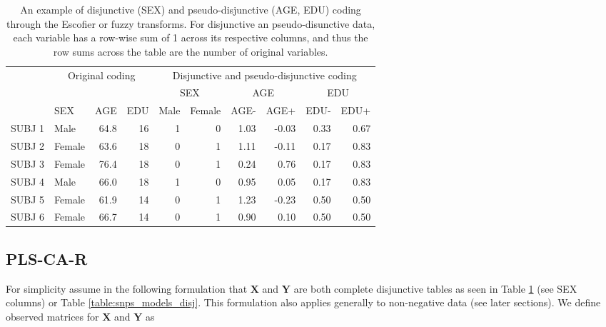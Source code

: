 \documentclass[12pt]{article}
\begin{document}
\begin{table}[!h]

\caption{\label{tab:unnamed-chunk-1}\label{table:disj} An example of disjunctive (SEX) and pseudo-disjunctive (AGE, EDU) coding through the Escofier or fuzzy transforms. For disjunctive an pseudo-disunctive data, each variable has a row-wise sum of 1 across its respective columns, and thus the row sums across the table are the number of original variables.}
\centering
\begin{tabular}[t]{llrrrrrrrr}
\toprule
\multicolumn{1}{c}{ } & \multicolumn{3}{c}{Original coding} & \multicolumn{6}{c}{Disjunctive and pseudo-disjunctive coding} \\
\cmidrule(l{2pt}r{2pt}){2-4} \cmidrule(l{2pt}r{2pt}){5-10}
\multicolumn{4}{c}{ } & \multicolumn{2}{c}{SEX} & \multicolumn{2}{c}{AGE} & \multicolumn{2}{c}{EDU} \\
\cmidrule(l{2pt}r{2pt}){5-6} \cmidrule(l{2pt}r{2pt}){7-8} \cmidrule(l{2pt}r{2pt}){9-10}
  & SEX & AGE & EDU & Male & Female & AGE- & AGE+ & EDU- & EDU+\\
\midrule
SUBJ 1 & Male & 64.8 & 16 & 1 & 0 & 1.03 & -0.03 & 0.33 & 0.67\\
SUBJ 2 & Female & 63.6 & 18 & 0 & 1 & 1.11 & -0.11 & 0.17 & 0.83\\
SUBJ 3 & Female & 76.4 & 18 & 0 & 1 & 0.24 & 0.76 & 0.17 & 0.83\\
SUBJ 4 & Male & 66.0 & 18 & 1 & 0 & 0.95 & 0.05 & 0.17 & 0.83\\
SUBJ 5 & Female & 61.9 & 14 & 0 & 1 & 1.23 & -0.23 & 0.50 & 0.50\\
\addlinespace
SUBJ 6 & Female & 66.7 & 14 & 0 & 1 & 0.90 & 0.10 & 0.50 & 0.50\\
\bottomrule
\end{tabular}
\end{table}

\hypertarget{pls-ca-r}{%
\subsection{PLS-CA-R}\label{pls-ca-r}}

\label{section:plscar_form}

For simplicity assume in the following formulation that \({\mathbf X}\)
and \({\mathbf Y}\) are both complete disjunctive tables as seen in
Table \ref{table:disj} (see SEX columns) or Table
\ref{table:snps_models_disj}. This formulation also applies generally to
non-negative data (see later sections). We define observed matrices for
\({\mathbf X}\) and \({\mathbf Y}\) as
\end{document}
